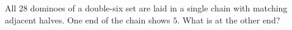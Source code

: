 All $28$ dominoes of a double-six set are laid in a single chain with matching adjacent halves. One end of the chain shows $5$. What is at the other end?
